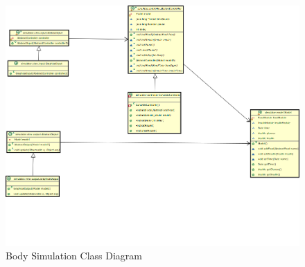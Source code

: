 \begin{landscape}
\begin{figure}[htb]
\centering
\includegraphics[width=\textwidth]{images/body_simulation_classdiagram.png}
\caption{Body Simulation Class Diagram}
\label{fig:body_simulation_class_diagram}
\end{figure}
\end{landscape}
